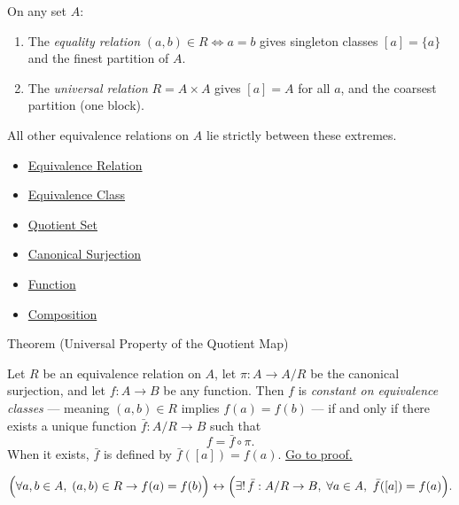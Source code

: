 \begin{remark*}[Exposition]
On any set $A$:
\begin{enumerate}
\item The \emph{equality relation} $(a,b) \in R \iff a=b$ gives singleton
classes $[a] = \{a\}$ and the finest partition of $A$.
\item The \emph{universal relation} $R = A \times A$ gives $[a] = A$ for all
$a$, and the coarsest partition (one block).
\end{enumerate}
All other equivalence relations on $A$ lie strictly between these extremes.
\end{remark*}

\begin{dependencies}
\begin{itemize}
  \item \hyperref[def:equivalence-rel]{Equivalence Relation}
  \item \hyperref[def:equiv-class]{Equivalence Class}
  \item \hyperref[def:quotient-set]{Quotient Set}
  \item \hyperref[def:canonical-surj]{Canonical Surjection}
  \item \hyperref[def:function]{Function}
  \item \hyperref[def:composition]{Composition}
\end{itemize}
\end{dependencies}


\begin{theorembox}{Theorem (Universal Property of the Quotient Map)}
\begin{theorem}
\label{thm:quotient-universal}
Let $R$ be an equivalence relation on $A$, let $\pi : A \to A/R$ be the
canonical surjection, and let $f : A \to B$ be any function. Then $f$ is
\emph{constant on equivalence classes} --- meaning $(a,b) \in R$ implies
$f(a) = f(b)$ --- if and only if there exists a unique function
$\bar{f} : A/R \to B$ such that
\[
f = \bar{f} \circ \pi.
\]
When it exists, $\bar{f}$ is defined by $\bar{f}([a]) = f(a)$.
\hyperref[prf:quotient-universal]{Go to proof.}
\end{theorem}
\end{theorembox}

\begin{remark*}
\[
  \Bigl(\forall a,b \in A,\; (a,b)\in R \to f(a) = f(b)\Bigr)
  \leftrightarrow
  \Bigl(\exists!\,\bar f:A/R\to B,\; \forall a\in A,\ \bar f([a])=f(a)\Bigr).
\]
\end{remark*}

